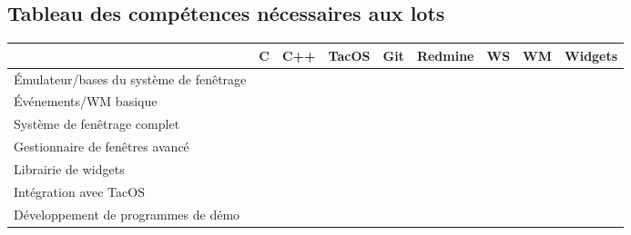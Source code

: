 \subsection{Tableau des compétences nécessaires aux lots}
\begin{tabular}{|l|c|c|c|c|c|c|c|c|}
  \rowcolor{dark_grey} \hline &  C \footnotemark[1] & C++ \footnotemark[2] & TacOS & Git & Redmine & WS \footnotemark[3] & WM \footnotemark[4] & Widgets \footnotemark[5] \\
  \hline
  Émulateur/bases du système de fenêtrage & \cellcolor[gray]{0} & \cellcolor[gray]{0.5} & \cellcolor[gray]{0} & \cellcolor[gray]{0.9} & \cellcolor[gray]{0.9} & \cellcolor[gray]{0} & \ \cellcolor[gray]{1} & \cellcolor[gray]{1} \\
  \hline
  Événements/WM basique & \cellcolor[gray]{0.75} & \cellcolor[gray]{0.25} & \cellcolor[gray]{1} & \cellcolor[gray]{0.9} & \cellcolor[gray]{0.9} & \cellcolor[gray]{0.25} & \ \cellcolor[gray]{0.5} & \cellcolor[gray]{1} \\
  \hline
  Système de fenêtrage complet & \cellcolor[gray]{0.5} & \cellcolor[gray]{0.25} & \cellcolor[gray]{1} & \cellcolor[gray]{0.9} & \cellcolor[gray]{0.9} & \cellcolor[gray]{0} & \ \cellcolor[gray]{0.75} & \cellcolor[gray]{1} \\
  \hline
  Gestionnaire de fenêtres avancé & \cellcolor[gray]{1} & \cellcolor[gray]{0} & \cellcolor[gray]{1} & \cellcolor[gray]{0.9} & \cellcolor[gray]{0.9} & \cellcolor[gray]{0.75} & \ \cellcolor[gray]{0} & \cellcolor[gray]{1} \\
  \hline
  Librairie de widgets & \cellcolor[gray]{1} & \cellcolor[gray]{0} & \cellcolor[gray]{1} & \cellcolor[gray]{0.9} & \cellcolor[gray]{0.9} & \cellcolor[gray]{1} & \ \cellcolor[gray]{1} & \cellcolor[gray]{0} \\
  \hline
  Intégration avec TacOS & \cellcolor[gray]{0} & \cellcolor[gray]{1} & \cellcolor[gray]{0} & \cellcolor[gray]{0.9} & \cellcolor[gray]{0.9} & \cellcolor[gray]{1} & \ \cellcolor[gray]{1} & \cellcolor[gray]{1} \\
  \hline
  Développement de programmes de démo & \cellcolor[gray]{1} & \cellcolor[gray]{0.5} & \cellcolor[gray]{1} & \cellcolor[gray]{0.9} & \cellcolor[gray]{0.9} & \cellcolor[gray]{1} & \ \cellcolor[gray]{1} & \cellcolor[gray]{0.25} \\
  \hline
\end{tabular}
